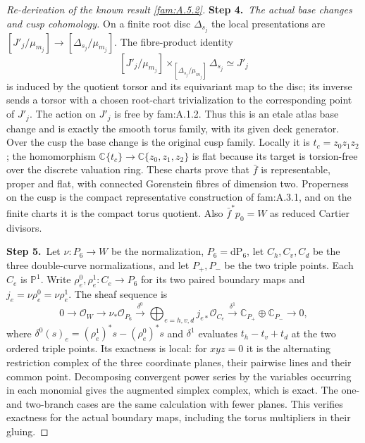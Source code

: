 \documentclass[11pt,a4paper]{article}
\theoremstyle{plain}
\theoremstyle{definition}
\begin{document}
\begin{proof}[Re-derivation of the known result \ref{fam:A.5.2}]
\par\smallskip\noindent\textbf{Step 4.}\ \emph{The actual base changes and cusp cohomology.}
On a finite root disc $\Delta_{s_j}$ the local presentations are
$[J'_j/\mu_{m_j}]\to[\Delta_{s_j}/\mu_{m_j}]$.
The fibre-product identity
\[
 [J'_j/\mu_{m_j}]
 \mathbin{\times_{[\Delta_{s_j}/\mu_{m_j}]}}\Delta_{s_j}
 \simeq J'_j
\]
is induced by the quotient torsor and its equivariant map to the disc;
its inverse sends a torsor with a chosen root-chart trivialization to
the corresponding point of $J'_j$. The action on $J'_j$ is free by
fam:A.1.2. Thus this is an etale atlas base change and is exactly the
smooth torus family, with its given deck generator. Over the cusp the
base change is the original cusp family. Locally it is
$t_c=z_0z_1z_2$; the homomorphism
$\mathbb C\{t_c\}\to\mathbb C\{z_0,z_1,z_2\}$ is flat because its
target is torsion-free over the discrete valuation ring.
These charts prove that $\bar f$ is representable, proper and flat,
with connected Gorenstein fibres of dimension two. Properness on the
cusp is the compact representative construction of fam:A.3.1, and on the
finite charts it is the compact torus quotient. Also
$\bar f^*p_0=W$ as reduced Cartier divisors.

\par\smallskip\noindent\textbf{Step 5.}\ Let $\nu:P_6\to W$ be the normalization, $P_6=\mathrm{dP}_6$, let
$C_h,C_v,C_d$ be the three double-curve normalizations, and let
$P_+,P_-$ be the two triple points. Each $C_e$ is $\mathbb P^1$.
Write $\rho_e^0,\rho_e^1:C_e\to P_6$ for its two paired boundary maps
and $j_e=\nu\rho_e^0=\nu\rho_e^1$. The sheaf sequence is
\begin{equation}\label{fam:eq:ab-cusp-resolution}
 0\longrightarrow\mathcal O_W\longrightarrow\nu_*\mathcal O_{P_6}
 \xrightarrow{\delta^0}\bigoplus_{e=h,v,d}j_{e*}\mathcal O_{C_e}
 \xrightarrow{\delta^1}\mathbb C_{P_+}\oplus\mathbb C_{P_-}
 \longrightarrow0,
\end{equation}
where $\delta^0(s)_e=(\rho_e^1)^*s-(\rho_e^0)^*s$ and
$\delta^1$ evaluates $t_h-t_v+t_d$ at the two ordered triple points.
Its exactness is local: for $xyz=0$ it is the alternating restriction
complex of the three coordinate planes, their pairwise lines and their
common point. Decomposing convergent power series by the variables
occurring in each monomial gives the augmented simplex complex, which
is exact. The one- and two-branch cases are the same calculation with
fewer planes. This verifies exactness for the actual boundary maps,
including the torus multipliers in their gluing.


\end{proof}
\end{document}
